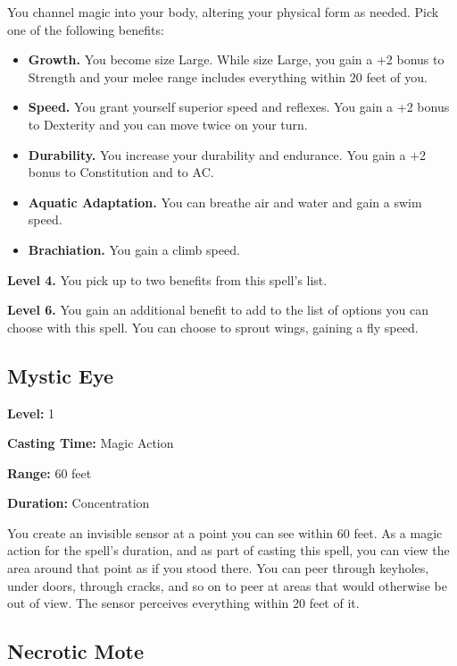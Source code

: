 \documentclass[12pt,letterpaper,twocolumn,openany,nodeprecatedcode,bg=none]{dndbook}
\providecommand{\tightlist}{%
  \setlength{\itemsep}{0pt}\setlength{\parskip}{0pt}}
\begin{document}
You channel magic into your body, altering your physical form as needed.
Pick one of the following benefits:

\begin{itemize}
\tightlist
\item
  \textbf{Growth.} You become size Large. While size Large, you gain a
  +2 bonus to Strength and your melee range includes everything within
  20 feet of you.
\item
  \textbf{Speed.} You grant yourself superior speed and reflexes. You
  gain a +2 bonus to Dexterity and you can move twice on your turn.
\item
  \textbf{Durability.} You increase your durability and endurance. You
  gain a +2 bonus to Constitution and to AC.
\item
  \textbf{Aquatic Adaptation.} You can breathe air and water and gain a
  swim speed.
\item
  \textbf{Brachiation.} You gain a climb speed.
\end{itemize}

\textbf{Level 4.} You pick up to two benefits from this spell's list.

\textbf{Level 6.} You gain an additional benefit to add to the list of
options you can choose with this spell. You can choose to sprout wings,
gaining a fly speed.

\clearpage

\subsection{Mystic Eye}\label{mystic-eye}

\textbf{Level:} 1

\textbf{Casting Time:} Magic Action

\textbf{Range:} 60 feet

\textbf{Duration:} Concentration

You create an invisible sensor at a point you can see within 60 feet. As
a magic action for the spell's duration, and as part of casting this
spell, you can view the area around that point as if you stood there.
You can peer through keyholes, under doors, through cracks, and so on to
peer at areas that would otherwise be out of view. The sensor perceives
everything within 20 feet of it.

\subsection{Necrotic Mote}\label{necrotic-mote}
\end{document}
